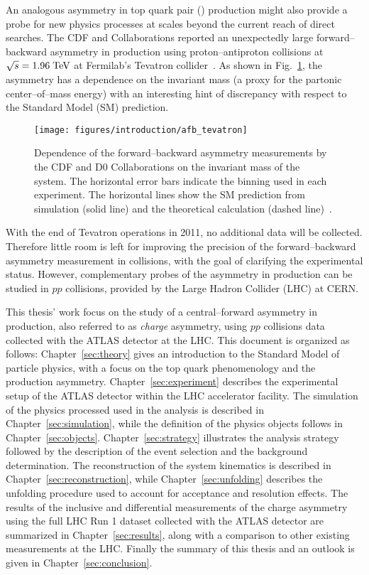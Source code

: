 An analogous asymmetry in top quark pair (\ttbar{}) production might also provide a
probe for new physics processes at scales beyond the current reach of direct
searches. The CDF and \dzero{} Collaborations reported an unexpectedly
large forward--backward asymmetry in \ttbar{} production using
proton--antiproton collisions at $\sqrt{s}=1.96\; \mathrm{TeV}{}$ at Fermilab's
Tevatron collider~\cite{Abazov:2014cca,Aaltonen:2012it}. As shown in
Fig.~\ref{fig:afbtev}, the asymmetry has a dependence on the \ttbar{}
invariant mass (a proxy for the partonic center--of--mass energy) with
an interesting hint of discrepancy with respect to the Standard Model (SM)
prediction.
\begin{figure}[!htb]\centering
  \texttt{[image: figures/introduction/afb\_tevatron]}
  \caption{Dependence of the forward--backward asymmetry measurements
    by the CDF and D0 Collaborations on the invariant mass of the
    \ttbar{} system. The horizontal error bars indicate the binning
    used in each experiment. The horizontal lines show the SM
    prediction from simulation (solid line) and the theoretical
    calculation (dashed line)~\cite{Bernreuther:2012sx}.}
  \label{fig:afbtev}
\end{figure}
With the end of Tevatron operations in 2011, no additional data will
be collected. Therefore little room is left for improving the
precision of the forward--backward asymmetry measurement in \ppbar{}
collisions, with the goal of clarifying the experimental status.
However, complementary probes of the asymmetry in \ttbar{} production
can be studied in $pp$ collisions, provided by the Large Hadron
Collider (LHC) at CERN.

This thesis' work focus on the study of a central--forward asymmetry in
\ttbar{} production, also referred to as {\it
  charge} asymmetry, using $pp$ collisions data collected with the
ATLAS detector at the LHC. This document is organized as follows:
Chapter~\ref{sec:theory} gives an introduction to the Standard Model
of particle physics, with a focus on the top quark phenomenology and
the production asymmetry. Chapter~\ref{sec:experiment} describes the
experimental setup of the ATLAS detector within the LHC accelerator
facility. 
The simulation of the physics processed
used in the analysis is described in Chapter~\ref{sec:simulation},
while the definition of the physics objects follows in
Chapter~\ref{sec:objects}. Chapter~\ref{sec:strategy} illustrates the
analysis strategy followed by the description of the event selection
and the background determination. The reconstruction of the \ttbar{}
system kinematics is described in Chapter~\ref{sec:reconstruction},
while Chapter~\ref{sec:unfolding} describes the unfolding procedure
used to account for acceptance and resolution effects.
The results of the inclusive and differential measurements of the
\ttbar{} charge asymmetry using the full LHC Run 1 dataset collected
with the ATLAS detector are summarized in Chapter~\ref{sec:results},
along with a comparison to other existing measurements at the LHC.
Finally the summary of this thesis and an outlook is given in
Chapter~\ref{sec:conclusion}.

